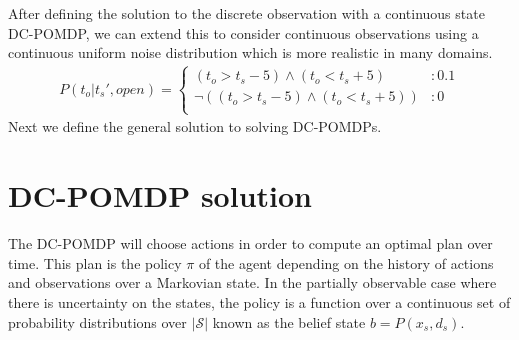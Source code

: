 \documentclass{article} %
\begin{document}
After defining the solution to the discrete observation with a continuous state DC-POMDP, we can extend this to consider continuous observations using a continuous uniform noise distribution which is more realistic in many domains. %
{\footnotesize
\begin{align}
P(t_o|t_s',open) = 
\begin{cases}
 (t_o>t_s-5) \wedge (t_o<t_s+5) &: 0.1 \\
 \neg((t_o>t_s-5) \wedge (t_o<t_s+5)) &: 0 \\
\end{cases}\nonumber
\end{align}
}
Next we define the general solution to solving DC-POMDPs. 


\section{DC-POMDP solution}
The DC-POMDP will choose actions in order to compute an optimal plan over time. This plan is the policy $\pi$ of the agent  depending on the history of actions and observations over a Markovian state. In the partially observable case where there is uncertainty on the states, the policy is a function over a continuous set of probability distributions over $|\mathcal{S}|$ known as the belief state $b = P(x_s,d_s)$.
\end{document}
